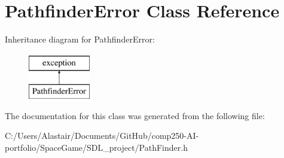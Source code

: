 \hypertarget{class_pathfinder_error}{}\section{Pathfinder\+Error Class Reference}
\label{class_pathfinder_error}
Inheritance diagram for Pathfinder\+Error\+:\begin{figure}[H]
\begin{center}
\leavevmode
\includegraphics[height=2.000000cm]{class_pathfinder_error}
\end{center}
\end{figure}


The documentation for this class was generated from the following file\+:\begin{DoxyCompactItemize}
\item 
C\+:/\+Users/\+Alastair/\+Documents/\+Git\+Hub/comp250-\/\+A\+I-\/portfolio/\+Space\+Game/\+S\+D\+L\+\_\+project/Path\+Finder.\+h\end{DoxyCompactItemize}
